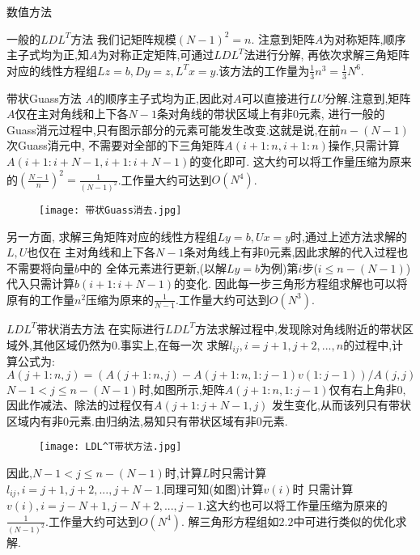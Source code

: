 \documentclass{article}
\begin{document}
\begin{section}{数值方法}
    \begin{subsection}{一般的$LDL^T$方法}
        我们记矩阵规模$(N-1)^2 = n.$
        注意到矩阵$A$为对称矩阵,顺序主子式均为正,知$A$为对称正定矩阵,可通过$LDL^T$法进行分解,
        再依次求解三角矩阵对应的线性方程组$Lz=b,Dy=z,L^Tx=y$.该方法的工作量为$\frac{1}{3}n^3 =\frac{1}{3}N^6.$ 
    \end{subsection}
    \begin{subsection}{带状Guass方法}
        $A$的顺序主子式均为正,因此对$A$可以直接进行$LU$分解.注意到,矩阵$A$仅在主对角线和上下各$N-1$条对角线的带状区域上有非$0$元素,
        进行一般的Guass消元过程中,只有图示部分的元素可能发生改变.这就是说,在前$n-(N-1)$次Guass消元中,
        不需要对全部的下三角矩阵$A(i+1:n,i+1:n)$操作,只需计算$A(i+1:i+N-1,i+1:i+N-1)$的变化即可.
        这大约可以将工作量压缩为原来的$(\frac{N-1}{n})^2 = \frac{1}{(N-1)^2}$.工作量大约可达到$O(N^4)$.

        \begin{figure}[ht]
            \centering         
            \texttt{[image: 带状Guass消去.jpg]}
        \end{figure}

        另一方面, 求解三角矩阵对应的线性方程组$Ly=b,Ux=y$时,通过上述方法求解的$L,U$也仅在
        主对角线和上下各$N-1$条对角线上有非$0$元素,因此求解的代入过程也不需要将向量$b$中的
        全体元素进行更新,(以解$Ly=b$为例)第$i$步($i\leq n-(N-1)$)代入只需计算$b(i+1:i+N-1)$的变化.
        因此每一步三角形方程组求解也可以将原有的工作量$n^2$压缩为原来的$\frac{1}{N-1}$.工作量大约可达到$O(N^3)$.
    \end{subsection}
    \begin{subsection}{$LDL^T$带状消去方法}
        在实际进行$LDL^T$方法求解过程中,发现除对角线附近的带状区域外,其他区域仍然为$0$.事实上,在每一次
        求解$l_{ij},i=j+1,j+2,...,n$的过程中,计算公式为:
            $$ A(j+1:n,j) = (A(j+1:n,j)-A(j+1:n,1:j-1)v(1:j-1))/A(j,j)$$
            $N-1<j\leq n-(N-1)$时,如图所示,矩阵$A(j+1:n,1:j-1)$仅有右上角非$0$,因此作减法、除法的过程仅有$A(j+1:j+N-1,j)$
            发生变化,从而该列只有带状区域内有非$0$元素.由归纳法,易知只有带状区域有非$0$元素.

        \begin{figure}[ht]
            \centering         
            \texttt{[image: LDL^T带状方法.jpg]}
        \end{figure}

        因此,$N-1<j\leq n-(N-1)$时,计算$L$时只需计算$l_{ij},i=j+1,j+2,...,j+N-1$.同理可知(如图)计算$v(i)$时
        只需计算$v(i),i=j-N+1,j-N+2,...,j-1$.这大约也可以将工作量压缩为原来的$\frac{1}{(N-1)^2}$.工作量大约可达到$O(N^4)$.
        解三角形方程组如$2.2$中可进行类似的优化求解.
    \end{subsection}
\end{section}
\end{document}
